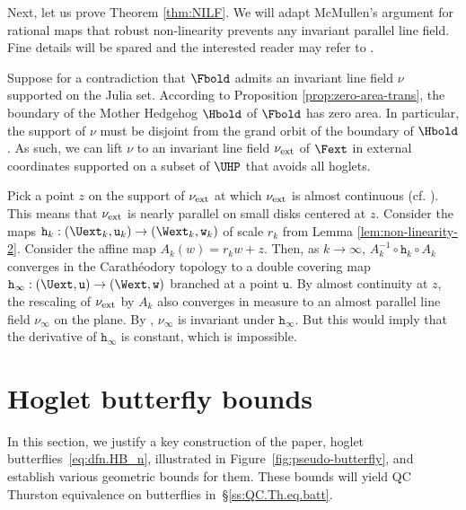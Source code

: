 \documentclass{amsart}
\begin{document}
Next, let us prove Theorem \ref{thm:NILF}. 
We will adapt McMullen's argument for rational maps that robust non-linearity prevents any invariant parallel line field. 
Fine details will be spared and the interested reader may refer to \cite[Proposition 3.2]{She03}.
    
Suppose for a contradiction that $\Fbold$ admits an invariant line field $\nu$ supported on the Julia set. 
According to Proposition \ref{prop:zero-area-trans}, the boundary of the Mother Hedgehog $\Hbold$ of $\Fbold$ has zero area. 
In particular, the support of $\nu$ must be disjoint from the grand orbit of the boundary of $\Hbold$.
As such, we can lift $\nu$ to an invariant line field $\nu_{\textnormal{ext}}$ of $\Fext$ in external coordinates supported on a subset of $\UHP$ that avoids all hoglets.
    
Pick a point $z$ on the support of $\nu_{\textnormal{ext}}$ at which $\nu_{\textnormal{ext}}$ is almost continuous (cf. \cite[Corollary 2.15]{McM94}). 
This means that $\nu_{\textnormal{ext}}$ is nearly parallel on small disks centered at $z$. 
Consider the maps $\mathtt{h}_k: (\Uext_k, \mathtt{u}_k) \to (\Wext_k, \mathtt{w}_k)$ of scale $r_k$ from Lemma \ref{lem:non-linearity-2}. 
Consider the affine map $A_k(w) = r_k w + z$. 
Then, as $k \to \infty$, $A_k^{-1} \circ \mathtt{h}_k \circ A_k$ converges in the Carath\'eodory topology to a double covering map $\mathtt{h}_\infty: (\Uext, \mathtt{u}) \to (\Wext,\mathtt{w})$ branched at a point $\mathtt{u}$. 
By almost continuity at $z$, the rescaling of $\nu_{\textnormal{ext}}$ by $A_k$ also converges in measure to an almost parallel line field $\nu_\infty$ on the plane. 
By \cite[Theorem 5.14]{McM94}, $\nu_\infty$ is invariant under $\mathtt{h}_\infty$. But this would imply that the derivative of $\mathtt{h}_\infty$ is constant, which is impossible.



\section{Hoglet butterfly bounds}
\label{sec:butterfly}

In this section, we justify a key construction of the paper, hoglet butterflies~\eqref{eq:dfn.HB_n}, illustrated in Figure~\ref{fig:pseudo-butterfly}, and establish various geometric bounds for them. These bounds will yield QC Thurston equivalence on butterflies in~\S\ref{ss:QC.Th.eq.batt}. 
\end{document}
